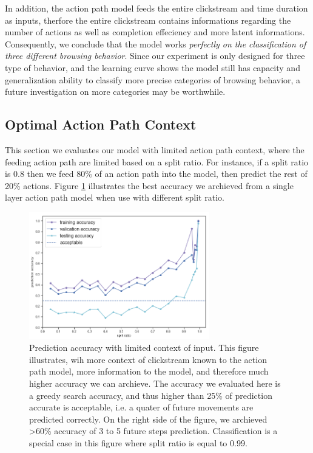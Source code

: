In addition, the action path model feeds the entire clickstream and time duration as inputs, 
therfore the entire clickstream contains informations regarding the number of actions
as well as completion effeciency and more latent informations. 
Consequently, we conclude that the model works
\emph{perfectly on the classification of three different browsing behavior}. 
Since our experiment is only designed for three type of behavior, and the learning curve
shows the model still has capacity and generalization ability to 
classify more precise categories of browsing behavior, a future investigation on
more categories may be worthwhile.

\subsection{Optimal Action Path Context}
\label{sec:eval-optimal}

This section we evaluates our model with limited action path context, where the feeding action path
are limited based on a split ratio. 
For instance, if a split ratio is 0.8 then we feed 80\% of an action path into the model, 
then predict the rest of 20\% actions. Figure \ref{fig:acc} illustrates the best accuracy 
we archieved from a single layer action path model when use with different split ratio.

\begin{figure}[H]
    \centering
    \includegraphics[width=0.7\textwidth]{figures/acc}
    \caption{Prediction accuracy with limited context of input. This figure illustrates, wih more context of clickstream
    known to the action path model, more information to the model, and therefore much higher accuracy we can archieve.
    The accuracy we evaluated here is a greedy search accuracy, and thus higher than 25\% of prediction accurate is acceptable,
    i.e. a quater of future movements are predicted correctly.
    On the right side of the figure, we archieved >60\% accuracy of 3 to 5 future steps prediction.
    Classification is a special case in this figure where split ratio is equal to 0.99.}
    \label{fig:acc}
\end{figure}

